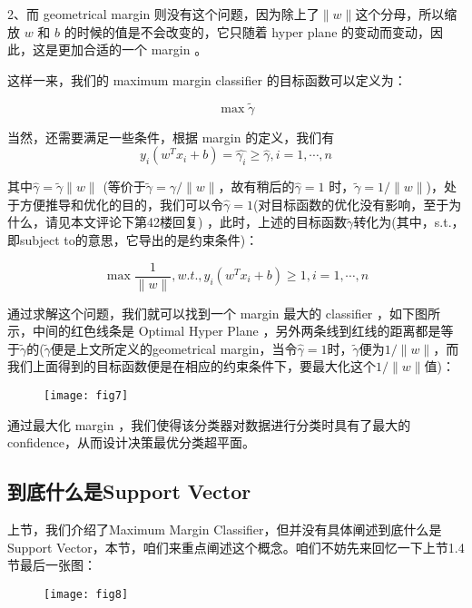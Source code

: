 \documentclass[a4paper,12pt]{article}
\begin{document}
2、而 geometrical margin 则没有这个问题，因为除上了$\|w\|$这个分母，所以缩放 $w$ 和 $b$ 的时候的值是不会改变的，它只随着 hyper plane 的变动而变动，因此，这是更加合适的一个 margin 。

这样一来，我们的 maximum margin classifier 的目标函数可以定义为：

\begin{equation}
  \max\widetilde{\gamma}
\end{equation}

当然，还需要满足一些条件，根据 margin 的定义，我们有
\begin{equation}
  y_i(w^Tx_i+b)=\widehat{\gamma_i}\geq\widehat{\gamma},i=1,\cdots,n
\end{equation}

其中$\widehat{\gamma}=\widetilde{\gamma}\|w\|$ (等价于$\widetilde{\gamma}=\gamma/\|w\|$，故有稍后的$\widehat{\gamma}  =1$ 时，$\widetilde{\gamma}  = 1 / \|w\|$)，处于方便推导和优化的目的，我们可以令$\widehat{\gamma}=1$(对目标函数的优化没有影响，至于为什么，请见本文评论下第42楼回复) ，此时，上述的目标函数$\widetilde{\gamma}$转化为(其中，s.t.，即subject to的意思，它导出的是约束条件)：

\begin{equation}
  \max\frac{1}{\|w\|},w.t.,y_i(w^Tx_i+b)\geq1,i=1,\cdots,n
\end{equation}

通过求解这个问题，我们就可以找到一个 margin 最大的 classifier ，如下图所示，中间的红色线条是 Optimal Hyper Plane ，另外两条线到红线的距离都是等于$\widetilde{\gamma}$的($\widetilde{\gamma}$便是上文所定义的geometrical margin，当令$\widehat{\gamma}=1$时，$\widetilde{\gamma}$便为$1/\|w\|$，而我们上面得到的目标函数便是在相应的约束条件下，要最大化这个$1/\|w\|$值)：

\begin{figure}[H]
  \centering
  \texttt{[image: fig7]}
\end{figure}
通过最大化 margin ，我们使得该分类器对数据进行分类时具有了最大的 confidence，从而设计决策最优分类超平面。

\subsection{到底什么是Support Vector}
上节，我们介绍了Maximum Margin Classifier，但并没有具体阐述到底什么是Support Vector，本节，咱们来重点阐述这个概念。咱们不妨先来回忆一下上节1.4节最后一张图：
\begin{figure}[H]
  \centering
  \texttt{[image: fig8]}
\end{figure}
\end{document}
